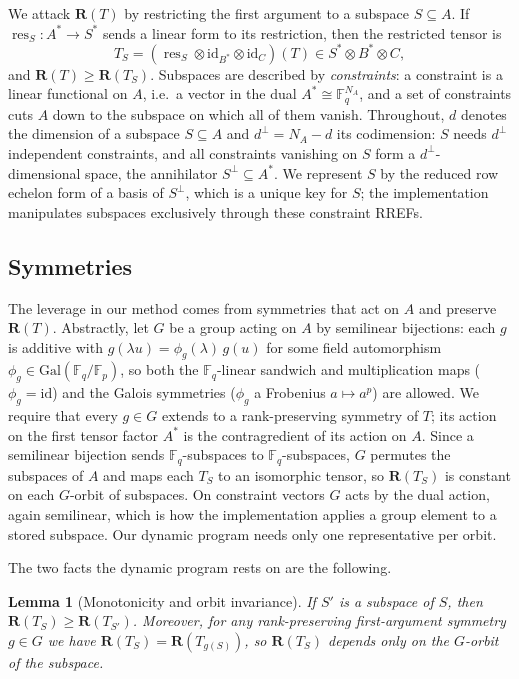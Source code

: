 \documentclass[11pt]{article}
\newtheorem{lemma}{Lemma}
\theoremstyle{definition}
\newcommand{\F}{\mathbb{F}}
\newcommand{\R}{\mathbf{R}}
\newcommand{\Gal}{\mathrm{Gal}}
\begin{document}
We attack $\R(T)$ by restricting the first argument to a subspace $S\subseteq A$.
If $\operatorname{res}_S\colon A^*\to S^*$ sends a linear form to its restriction,
then the restricted tensor is
\[
  T_S=(\operatorname{res}_S\otimes\mathrm{id}_{B^*}\otimes\mathrm{id}_C)(T)
  \in S^*\otimes B^*\otimes C,
\]
and $\R(T)\ge\R(T_S)$.
Subspaces are described by \emph{constraints}: a constraint is a linear
functional on $A$, i.e.\ a vector in the dual $A^*\cong\F_q^{N_A}$, and a set of
constraints cuts $A$ down to the subspace on which all of them vanish.
Throughout, $d$ denotes the dimension of a subspace $S\subseteq A$ and
$d^{\perp}=N_A-d$ its codimension: $S$ needs $d^{\perp}$ independent constraints,
and all constraints vanishing on $S$ form a $d^{\perp}$-dimensional space, the
annihilator $S^{\perp}\subseteq A^*$. We represent $S$ by the reduced row echelon form of a
basis of $S^{\perp}$, which is a unique key for $S$; the
implementation manipulates subspaces exclusively through these constraint RREFs.

\subsection{Symmetries}

The leverage in our method comes from symmetries that act on $A$ and preserve
$\R(T)$. Abstractly, let $G$ be a group acting on $A$ by semilinear
bijections: each $g$ is additive with $g(\lambda u)=\phi_g(\lambda)\,g(u)$ for
some field automorphism $\phi_g\in\Gal(\F_q/\F_p)$, so both the $\F_q$-linear
sandwich and multiplication maps ($\phi_g=\mathrm{id}$) and the Galois symmetries
($\phi_g$ a Frobenius $a\mapsto a^p$) are allowed. We require that every
$g\in G$ extends to a rank-preserving symmetry of $T$; its action on the first
tensor factor $A^*$ is the contragredient of its action on $A$. Since a semilinear bijection sends $\F_q$-subspaces to
$\F_q$-subspaces, $G$ permutes the subspaces of $A$ and maps each $T_S$ to an
isomorphic tensor, so $\R(T_S)$ is constant on each $G$-orbit of subspaces. On
constraint vectors $G$ acts by the dual action, again semilinear, which is how
the implementation applies a group element to a stored subspace. Our
dynamic program needs only one representative per orbit.

The two facts the dynamic program rests on are the following.

\begin{lemma}[Monotonicity and orbit invariance]\label{lem:foundation}
  If $S'$ is a subspace of $S$, then $\R(T_{S})\ge\R(T_{S'})$. Moreover, for any rank-preserving
  first-argument symmetry $g\in G$ we have $\R(T_{S})=\R(T_{g(S)})$, so $\R(T_S)$
  depends only on the $G$-orbit of the subspace.
\end{lemma}
\end{document}
